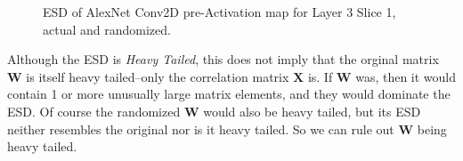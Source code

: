 \begin{figure}[H]
   \centering
   \caption{ESD of AlexNet Conv2D pre-Activation map for Layer 3 Slice 1, actual and randomized.
           }
   \label{fig:alexnet}
\end{figure}


Although the ESD is \emph{Heavy Tailed}, this does not imply that the orginal matrix $\mathbf{W}$ is itself heavy tailed--only the correlation matrix $\mathbf{X}$ is. 
If $\mathbf{W}$ was, then it would contain 1 or more unusually large matrix elements, and they would dominate the ESD.  
Of course the randomized $\mathbf{W}$ would also be heavy tailed, but its ESD neither resembles the original nor is it heavy tailed. 
So we can rule out $\mathbf{W}$ being heavy tailed.

